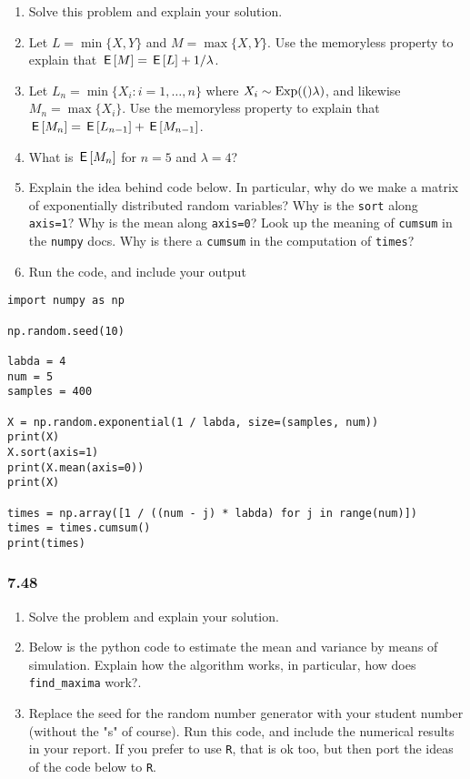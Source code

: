 \documentclass[a4paper]{article}
\begin{document}
\begin{enumerate}
\item Solve this problem and explain your solution.
\item Let \(L=\min\{X,Y\}\) and \(M=\max\{X,Y\}\). Use the memoryless property to explain that \(\,\mathsf{E}\left[M\right] = \,\mathsf{E}\left[L\right] + 1/\lambda\).
\item Let \(L_{n}=\min\{X_{i} : i = 1,\ldots, n\}\) where \(X_i\sim \mathrm{Exp}(()\lambda)\), and likewise  \(M_{n}=\max\{X_i\}\). Use the memoryless property to explain that \(\,\mathsf{E}\left[M_{n}\right] = \,\mathsf{E}\left[L_{n-1}\right] + \,\mathsf{E}\left[M_{n-1}\right]\).
\item What is \(\,\mathsf{E}\left[M_n\right]\) for \(n=5\) and \(\lambda = 4\)?
\item Explain the idea behind code below. In particular, why do we make a matrix of exponentially distributed random variables? Why is the \texttt{sort} along \texttt{axis=1}? Why is the mean along \texttt{axis=0}? Look up the meaning of \texttt{cumsum} in the \texttt{numpy} docs. Why is there a \texttt{cumsum} in the computation of \texttt{times}?
\item Run the code, and include your output
\end{enumerate}


\begin{verbatim}
import numpy as np

np.random.seed(10)

labda = 4
num = 5
samples = 400

X = np.random.exponential(1 / labda, size=(samples, num))
print(X)
X.sort(axis=1)
print(X.mean(axis=0))
print(X)

times = np.array([1 / ((num - j) * labda) for j in range(num)])
times = times.cumsum()
print(times)
\end{verbatim}




\subsubsection{7.48}
\label{sec:org56d10c5}
\begin{enumerate}
\item Solve  the problem and explain your solution.
\item Below is the python code to estimate the mean and variance by means of simulation.   Explain how the algorithm works, in particular, how does \texttt{find\_maxima} work?.
\item Replace the seed for the random number generator with your student number (without the "s" of course). Run this code, and include the numerical results in your report. If you prefer to use \texttt{R}, that is ok too, but then port the ideas of the code below to \texttt{R}.
\end{enumerate}
\end{document}
